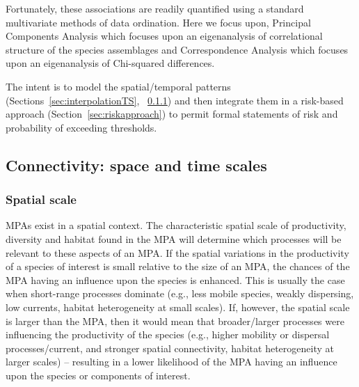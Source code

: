 \documentclass[letterpaper,portrait,11pt]{scrartcl}
\numberwithin{equation}{section}    %
\numberwithin{figure}{section}    %
\numberwithin{table}{section}       %
\begin{document}
Fortunately, these associations are readily quantified using a standard multivariate methods of data ordination. Here we focus upon, Principal Components Analysis which focuses upon an eigenanalysis of correlational structure of the species assemblages and Correspondence Analysis which focuses upon an eigenanalysis of Chi-squared differences.

The intent is to model the spatial/temporal patterns (Sections~\ref{sec:interpolationTS}, ~\ref{sec:interpolationSpatial}) and then integrate them in a risk-based approach (Section~\ref{sec:riskapproach}) to permit formal statements of risk and probability of exceeding thresholds.



\subsection{Connectivity: space and time scales}
\label{sec:connectivity}

\subsubsection{Spatial scale}
\label{sec:interpolationSpatial}

MPAs exist in a spatial context. The characteristic spatial scale of productivity, diversity and habitat found in the MPA will determine which processes will be relevant to these aspects of an MPA. If the spatial variations in the productivity of a species of interest is small relative to the size of an MPA, the chances of the MPA having an influence upon the species is enhanced. This is usually the case when short-range processes dominate (e.g., less mobile species, weakly dispersing, low currents, habitat heterogeneity at small scales). If, however, the spatial scale is larger than the MPA, then it would mean that broader/larger processes were influencing the productivity of the species (e.g., higher mobility or dispersal processes/current, and stronger spatial connectivity, habitat heterogeneity at larger scales) -- resulting in a lower likelihood of the MPA having an influence upon the species or components of interest.
\end{document}
